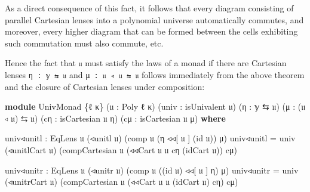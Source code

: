 \documentclass[
  11pt,
  oneside,
  article]{memoir}
\newenvironment{Shaded}{}{}
\newcommand{\KeywordTok}[1]{\textcolor[rgb]{0.00,0.44,0.13}{\textbf{#1}}}
\newcommand{\NormalTok}[1]{#1}
\newcommand{\OtherTok}[1]{\textcolor[rgb]{0.00,0.44,0.13}{#1}}
\theoremstyle{definition}
\theoremstyle{plain}
\newcommand{\0}{\textsf{0}}
\newcommand{\1}{\tn{\textsf{1}}}
\begin{document}
As a direct consequence of this fact, it follows that every diagram
consisting of parallel Cartesian lenses into a polynomial universe
automatically commutes, and moreover, every higher diagram that can be
formed between the cells exhibiting such commutation must also commute,
etc.

Hence the fact that \texttt{𝔲} must satisfy the laws of a monad if there
are Cartesian lenses \texttt{η\ :\ 𝕪\ ⇆\ 𝔲} and
\texttt{μ\ :\ 𝔲\ ◃\ 𝔲\ ⇆\ 𝔲} follows immediately from the above theorem
and the closure of Cartesian lenses under composition:

\begin{Shaded}
\begin{Highlighting}[]
\KeywordTok{module}\NormalTok{ UnivMonad }\OtherTok{\{}\NormalTok{ℓ κ}\OtherTok{\}} \OtherTok{(}\NormalTok{𝔲 }\OtherTok{:}\NormalTok{ Poly ℓ κ}\OtherTok{)} \OtherTok{(}\NormalTok{univ }\OtherTok{:}\NormalTok{ isUnivalent 𝔲}\OtherTok{)}
                 \OtherTok{(}\NormalTok{η }\OtherTok{:}\NormalTok{ 𝕪 ⇆ 𝔲}\OtherTok{)} \OtherTok{(}\NormalTok{μ }\OtherTok{:} \OtherTok{(}\NormalTok{𝔲 ◃ 𝔲}\OtherTok{)}\NormalTok{ ⇆ 𝔲}\OtherTok{)}
                 \OtherTok{(}\NormalTok{cη }\OtherTok{:}\NormalTok{ isCartesian 𝔲 η}\OtherTok{)} \OtherTok{(}\NormalTok{cμ }\OtherTok{:}\NormalTok{ isCartesian 𝔲 μ}\OtherTok{)} \KeywordTok{where}

\NormalTok{    univ◃unitl }\OtherTok{:}\NormalTok{ EqLens 𝔲 }\OtherTok{(}\NormalTok{◃unitl 𝔲}\OtherTok{)} \OtherTok{(}\NormalTok{comp 𝔲 }\OtherTok{(}\NormalTok{η ◃◃[ 𝔲 ] }\OtherTok{(}\NormalTok{id 𝔲}\OtherTok{))}\NormalTok{ μ}\OtherTok{)}
\NormalTok{    univ◃unitl }\OtherTok{=}\NormalTok{ univ }\OtherTok{(}\NormalTok{◃unitlCart 𝔲}\OtherTok{)} 
                      \OtherTok{(}\NormalTok{compCartesian 𝔲 }\OtherTok{(}\NormalTok{◃◃Cart 𝔲 𝔲 cη }\OtherTok{(}\NormalTok{idCart 𝔲}\OtherTok{))}\NormalTok{ cμ}\OtherTok{)}

\NormalTok{    univ◃unitr }\OtherTok{:}\NormalTok{ EqLens 𝔲 }\OtherTok{(}\NormalTok{◃unitr 𝔲}\OtherTok{)} \OtherTok{(}\NormalTok{comp 𝔲 }\OtherTok{((}\NormalTok{id 𝔲}\OtherTok{)}\NormalTok{ ◃◃[ 𝔲 ] η}\OtherTok{)}\NormalTok{ μ}\OtherTok{)}
\NormalTok{    univ◃unitr }\OtherTok{=}\NormalTok{ univ }\OtherTok{(}\NormalTok{◃unitrCart 𝔲}\OtherTok{)} 
                      \OtherTok{(}\NormalTok{compCartesian 𝔲 }\OtherTok{(}\NormalTok{◃◃Cart 𝔲 𝔲 }\OtherTok{(}\NormalTok{idCart 𝔲}\OtherTok{)}\NormalTok{ cη}\OtherTok{)}\NormalTok{ cμ}\OtherTok{)}



\end{Highlighting}
\end{Shaded}
\end{document}
